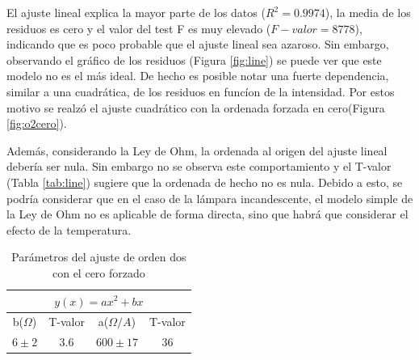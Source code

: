 \documentclass[twoside,twocolumn,a4paper]{article}
\begin{document}
El ajuste lineal explica la mayor parte de los datos ($R^2=0.9974$), la media de los residuos es cero y el valor del test F es muy elevado ($F-valor=8778$), indicando que es poco probable que el ajuste lineal sea azaroso. Sin embargo, observando el gr\'afico de los residuos (Figura \ref{fig:line}) se puede ver que este modelo no es el m\'as ideal. De hecho es posible notar una fuerte dependencia, similar a una cuadr\'atica, de los residuos en func\'ion de la intensidad. Por estos motivo se realz\'o el ajuste cuadr\'atico con la ordenada forzada en cero(Figura \ref{fig:o2cero}).\par
Adem\'as, considerando la Ley de Ohm, la ordenada al origen del ajuste lineal deber\'ia ser nula. Sin embargo no se observa este comportamiento y el T-valor (Tabla \ref{tab:line}) sugiere que la ordenada de hecho no es nula. Debido a esto, se podr\'ia considerar que en el caso de la l\'ampara incandescente, el modelo simple de la Ley de Ohm no es aplicable de forma directa, sino que habr\'a que considerar el efecto de la temperatura.


\begin{table}[h]
\centering
\caption{Par\'ametros del ajuste de orden dos con el cero forzado}
\label{tab:o20}
\begin{tabular}{|c|c|c|c|}
\hline
\multicolumn{4}{|c|}{$y(x)=ax^2+bx$}   \\ \hline
b($\Omega$)& T-valor & a($\Omega/A$) & T-valor \\ \hline
$6\pm2$	   & 3.6     & $600\pm17$    & 36     \\ \hline
\end{tabular}
\end{table}
\end{document}
